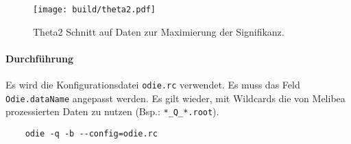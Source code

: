 \begin{wrapfigure}[10]{L}{0.45\textwidth}
		\centering
		\texttt{[image: build/theta2.pdf]}
		\caption{Theta2 Schnitt auf Daten zur Maximierung der Signifikanz.}%
		\label{fig:thetacut}
\end{wrapfigure}


\paragraph{Durchführung}%

Es wird die Konfigurationsdatei \texttt{odie.rc} verwendet.
Es muss das Feld \texttt{Odie.dataName} angepasst werden.
Es gilt wieder, mit Wildcards die von Melibea prozessierten Daten zu nutzen
(Bsp.: \texttt{*\_Q\_*.root}).

\begin{lstlisting}
	odie -q -b --config=odie.rc
\end{lstlisting}
